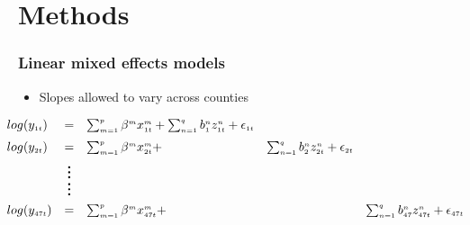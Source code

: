 \documentclass{beamer}              %
\begin{document}
\section{Methods}

\begin{frame}
\frametitle{\small Linear mixed effects models}\label{Methods} 

\begin{itemize}
\item \small Slopes allowed to vary across counties
\end{itemize}


\begingroup
\everymath{\small}

\begin{align*}
\hspace{-0.5cm} \begin{array}{lclll}
 log(y_{\scriptscriptstyle 1t} )&=&\sum_{\scriptscriptstyle m=1}^{\scriptscriptstyle p} \beta^{\scriptscriptstyle m}x^{\scriptscriptstyle m}_{\scriptscriptstyle 1t}+ \sum_{\scriptscriptstyle n=1}^{\scriptscriptstyle q}b^{\scriptscriptstyle n}_{\scriptscriptstyle 1}z^{\scriptscriptstyle n}_{\scriptscriptstyle 1t}+\epsilon_{\scriptscriptstyle 1t} \\[2mm]
 log(y_{\scriptscriptstyle 2t} )&=&\sum_{\scriptscriptstyle m=1}^{\scriptscriptstyle p} \beta^{\scriptscriptstyle m}x^{\scriptscriptstyle m}_{\scriptscriptstyle 2t}+ &\sum_{\scriptscriptstyle n=1}^{\scriptscriptstyle q}b^{\scriptscriptstyle n}_{\scriptscriptstyle 2}z^{\scriptscriptstyle n}_{\scriptscriptstyle 2t}+\epsilon_{\scriptscriptstyle 2t}\\[1mm]
  &\huge{\vdots}\\[-2mm]
  & \huge{\vdots} \\[1mm]
  log(y_{\scriptscriptstyle 47t} )&=&\sum_{\scriptscriptstyle m=1}^{\scriptscriptstyle p} \beta^{\scriptscriptstyle m}x^{\scriptscriptstyle m}_{\scriptscriptstyle 47t}+ &&\sum_{\scriptscriptstyle n=1}^{\scriptscriptstyle q}b^{\scriptscriptstyle n}_{\scriptscriptstyle 47}z^{\scriptscriptstyle n}_{\scriptscriptstyle 47t}+\epsilon_{\scriptscriptstyle 47t}
\end{array}
\end{align*}
\endgroup




\begin{table}
\begin{footnotesize}
\begin{tabular}{lll}


\end{tabular}
\end{footnotesize}
\end{table}
\end{frame}
\end{document}
